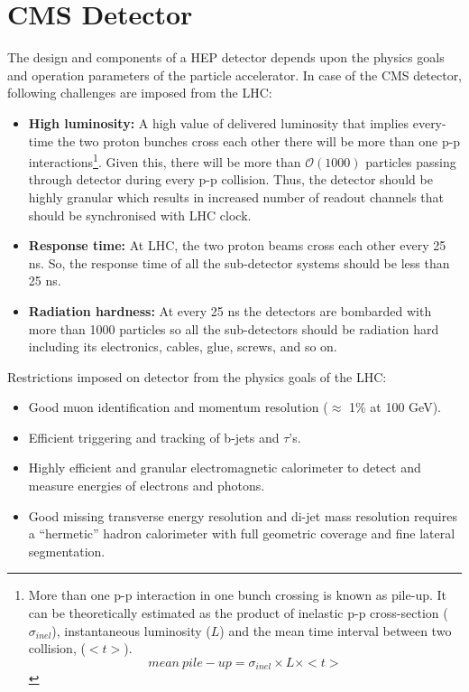 \section{CMS Detector} %
\label{sec:cms_experiment}
The design and components of a HEP detector depends upon the physics goals and operation parameters of the particle accelerator. In case of the CMS detector, following challenges are imposed from the LHC:
\begin{itemize}
	\item \textbf{High luminosity:} A high value of  delivered luminosity that implies every-time the two proton bunches cross each other there will be more than one p-p interactions\footnote{More than one p-p interaction in one bunch crossing is known as pile-up. It can be theoretically estimated as the product of inelastic p-p cross-section ($\sigma_{inel}$), instantaneous luminosity ($L$) and the mean time interval between two collision, ($< t >$). \begin{equation}
		mean~pile-up = \sigma_{inel} \times L \times <t>
	\end{equation}}. Given this, there will be more than $\mathcal{O}(1000)$ particles passing through detector during every p-p collision. Thus, the detector should be highly granular which results in increased number of readout channels that should be synchronised with LHC clock.
	\item \textbf{Response time:} At LHC, the two proton beams cross each other every 25 ns. So, the response time of all the sub-detector systems should be less than 25 ns.
	\item \textbf{Radiation hardness:} At every 25 ns the detectors are bombarded with more than 1000 particles so all the sub-detectors should be radiation hard including its electronics, cables, glue, screws, and so on.
\end{itemize}

Restrictions imposed on detector from the physics goals of the LHC:

\begin{itemize}
	\item Good muon identification and momentum resolution ($\approx$ 1\% at 100 GeV).
	\item Efficient triggering and tracking of b-jets and $\tau$'s.
	\item Highly efficient and granular electromagnetic calorimeter to detect and measure energies of electrons and photons.
	\item Good missing transverse energy resolution and di-jet mass resolution requires a ``hermetic'' hadron calorimeter with full geometric coverage and fine lateral segmentation.
\end{itemize}

